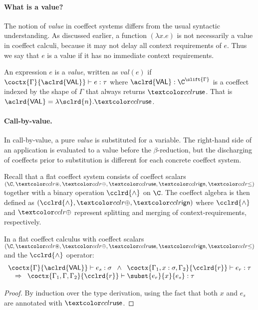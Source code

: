 \paragraph{What is a value?}
The notion of \emph{value} in coeffect systems differs from the usual syntactic understanding.
As discussed earlier, a function $(\lambda x.e)$ is not necessarily a value in coeffect calculi, 
because it may not delay all context requirements of $e$. Thus we say that $e$ is a value if it
has no immediate context requirements.

\begin{definition} 
An expression $e$ is a \emph{value}, written as $\textit{val}(e)$ if $\coctx{\Gamma}{ \aclrd{\mathsf{VAL}} } \vdash e : \tau$ 
where $\aclrd{\mathsf{VAL}} : \C^{\slift{\Gamma}}$ is a coeffect indexed by the shape of $\Gamma$ that
always returns $\cunit$. That is $\aclrd{\mathsf{VAL}} = \lambda \sclrd{n} . \cunit$.
\end{definition}

\paragraph{Call-by-value.}
In call-by-value, a pure \emph{value} is substituted for a variable. 
The right-hand side of an application is evaluated to a value before the
$\beta$-reduction, but the discharging of coeffects prior to substitution is
different for each concrete coeffect system.  

Recall that a flat coeffect system consists of coeffect scalars $(\C, \cseq, \cpar, \cunit, \czero, \cleq)$ 
together with a binary operation $\cclrd{\wedge}$ on $\C$. The coeffect algebra is then defined
as $(\cclrd{\wedge}, \cpar, \czero)$ where $\cclrd{\wedge}$ and $\cpar$ represent splitting and
merging of context-requirements, respectively.

\begin{lemma}
\label{thm:flat-subst-cbv}
In a flat coeffect calculus with coeffect scalars $(\C, \cseq, \cpar, \cunit, \czero, \cleq)$ 
and the $\cclrd{\wedge}$ operator:
\[
\begin{array}{l}
\coctx{\Gamma}{\aclrd{\mathsf{VAL}}} \vdash e_s : \sigma \;\; \wedge \;\; \coctx{\Gamma_1,  x : \sigma, \Gamma_2}{ \cclrd{r}  } \vdash e_r : \tau\\
\quad \Rightarrow \;\; \coctx{\Gamma_1,\Gamma,\Gamma_2}{ \cclrd{r} } \vdash \subst{e_r}{x}{e_s} : \tau
\end{array}
\]
\end{lemma}
\begin{proof}
By induction over the type derivation, using the fact that both $x$ and $e_s$ are annotated
with $\cunit$.
\end{proof}

